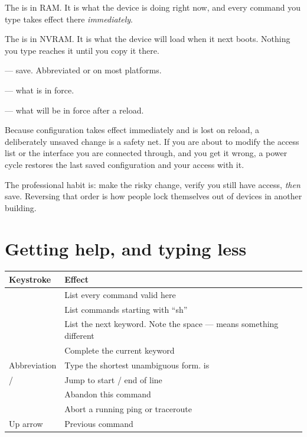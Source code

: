 \begin{definitionbox}
The  is in RAM. It is what the device is doing right
now, and every command you type takes effect there \emph{immediately}.

The  is in NVRAM. It is what the device will load
when it next boots. Nothing you type reaches it until you copy it there.
\begin{tight}
  \item {} --- save. Abbreviated
         or  on most platforms.
  \item {} --- what is in force.
  \item {} --- what will be in force after a reload.
\end{tight}
\end{definitionbox}

\begin{alertbox}
Because configuration takes effect immediately and is lost on reload, a
deliberately unsaved change is a safety net. If you are about to modify the
access list or the interface you are connected through, and you get it wrong, a
power cycle restores the last saved configuration and your access with it.

The professional habit is: make the risky change, verify you still have access,
\emph{then} save. Reversing that order is how people lock themselves out of
devices in another building.
\end{alertbox}

\section{Getting help, and typing less}

\begin{longtable}{@{}L{4.6cm}L{11.0cm}@{}}
\toprule
{}
\textbf{Keystroke} & \textbf{Effect} \\
\midrule
\endhead
{} & List every command valid here \\
 & List commands starting with ``sh'' \\
 & List the next keyword. Note the space ---  means
something different \\
 & Complete the current keyword \\
Abbreviation & Type the shortest unambiguous form.  is
 \\
 /  & Jump to start / end of line \\
 & Abandon this command \\
 & Abort a running ping or traceroute \\
Up arrow & Previous command \\
\bottomrule
\end{longtable}

